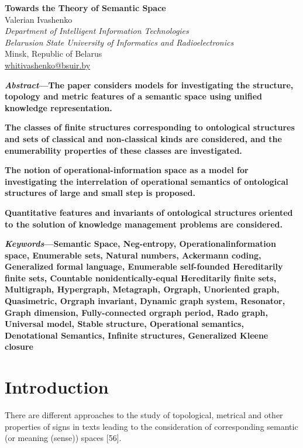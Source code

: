 \documentclass[10pt, a4paper]{article}
\begin{document}
\begin{center}
\huge{\textbf{Towards the Theory of Semantic Space}}\\
\vspace{0.4cm}
\normalsize
Valerian Ivashenko\\
\textit{Department of Intelligent Information Technologies\\
Belarusion State University of Informatics and Radioelectronics}\\
Minsk, Republic of Belarus\\
\href{mailto:ivashenko@bsuir.by}{whitivashenko@bsuir.by}
\end{center}
\begin{multicols}{2}
\textbf{\textit{Abstract}—The paper considers models for investigating
the structure, topology and metric features of a semantic
space using unified knowledge representation.}

\textbf{The classes of finite structures corresponding to ontological structures and sets of classical and non-classical kinds
are considered, and the enumerability properties of these
classes are investigated.}

\textbf{The notion of operational-information space as a model
for investigating the interrelation of operational semantics
of ontological structures of large and small step is proposed.}

\textbf{Quantitative features and invariants of ontological structures oriented to the solution of knowledge management
problems are considered.}

\textbf{\textit{Keywords}—Semantic Space, Neg-entropy, Operationalinformation space, Enumerable sets, Natural numbers,
Ackermann coding, Generalized formal language, Enumerable self-founded Hereditarily finite sets, Countable nonidentically-equal Hereditarily finite sets, Multigraph, Hypergraph, Metagraph, Orgraph, Unoriented graph, Quasimetric, Orgraph invariant, Dynamic graph system, Resonator, Graph dimension, Fully-connected orgraph period,
Rado graph, Universal model, Stable structure, Operational
semantics, Denotational Semantics, Infinite structures, Generalized Kleene closure}
\section{Introduction}

There are different approaches to the study of topological, metrical and other properties of signs in texts
leading to the consideration of corresponding semantic
(or meaning (sense)) spaces [56].


\end{multicols}
\end{document}
